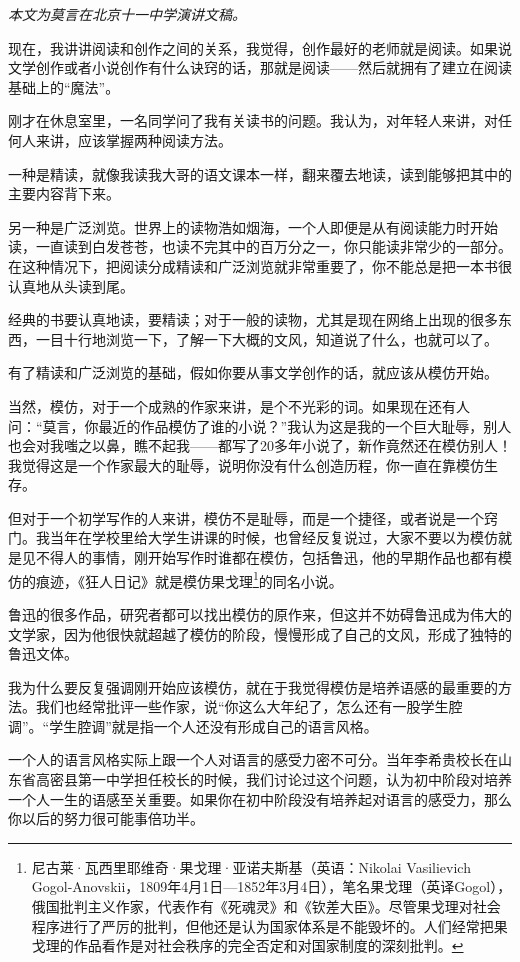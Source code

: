 \documentclass[12pt,a5paper]{ctexbook}
\begin{document}
\emph{本文为莫言在北京十一中学演讲文稿。}
\vspace{2em}

现在，我讲讲阅读和创作之间的关系，我觉得，创作最好的老师就是阅读。如果说文学创作或者小说创作有什么诀窍的话，那就是阅读——然后就拥有了建立在阅读基础上的“魔法”。

刚才在休息室里，一名同学问了我有关读书的问题。我认为，对年轻人来讲，对任何人来讲，应该掌握两种阅读方法。

一种是精读，就像我读我大哥的语文课本一样，翻来覆去地读，读到能够把其中的主要内容背下来。

另一种是广泛浏览。世界上的读物浩如烟海，一个人即便是从有阅读能力时开始读，一直读到白发苍苍，也读不完其中的百万分之一，你只能读非常少的一部分。在这种情况下，把阅读分成精读和广泛浏览就非常重要了，你不能总是把一本书很认真地从头读到尾。

经典的书要认真地读，要精读；对于一般的读物，尤其是现在网络上出现的很多东西，一目十行地浏览一下，了解一下大概的文风，知道说了什么，也就可以了。

有了精读和广泛浏览的基础，假如你要从事文学创作的话，就应该从模仿开始。

当然，模仿，对于一个成熟的作家来讲，是个不光彩的词。如果现在还有人问：“莫言，你最近的作品模仿了谁的小说？”我认为这是我的一个巨大耻辱，别人也会对我嗤之以鼻，瞧不起我——都写了20多年小说了，新作竟然还在模仿别人！我觉得这是一个作家最大的耻辱，说明你没有什么创造历程，你一直在靠模仿生存。

但对于一个初学写作的人来讲，模仿不是耻辱，而是一个捷径，或者说是一个窍门。我当年在学校里给大学生讲课的时候，也曾经反复说过，大家不要以为模仿就是见不得人的事情，刚开始写作时谁都在模仿，包括鲁迅，他的早期作品也都有模仿的痕迹，《狂人日记》就是模仿果戈理\footnote{尼古莱·瓦西里耶维奇·果戈理·亚诺夫斯基（英语：Nikolai Vasilievich Gogol-Anovskii，1809年4月1日—1852年3月4日），笔名果戈理（英译Gogol），俄国批判主义作家，代表作有《死魂灵》和《钦差大臣》。尽管果戈理对社会程序进行了严厉的批判，但他还是认为国家体系是不能毁坏的。人们经常把果戈理的作品看作是对社会秩序的完全否定和对国家制度的深刻批判。}的同名小说。

鲁迅的很多作品，研究者都可以找出模仿的原作来，但这并不妨碍鲁迅成为伟大的文学家，因为他很快就超越了模仿的阶段，慢慢形成了自己的文风，形成了独特的鲁迅文体。

我为什么要反复强调刚开始应该模仿，就在于我觉得模仿是培养语感的最重要的方法。我们也经常批评一些作家，说“你这么大年纪了，怎么还有一股学生腔调”。“学生腔调”就是指一个人还没有形成自己的语言风格。

一个人的语言风格实际上跟一个人对语言的感受力密不可分。当年李希贵校长在山东省高密县第一中学担任校长的时候，我们讨论过这个问题，认为初中阶段对培养一个人一生的语感至关重要。如果你在初中阶段没有培养起对语言的感受力，那么你以后的努力很可能事倍功半。
\end{document}
